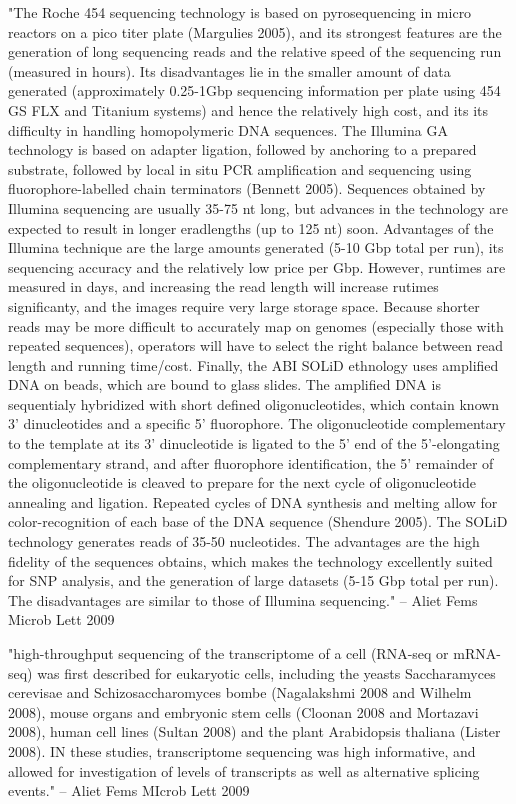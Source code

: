 \documentclass[10pt]{article}
\begin{document}
"The Roche 454 sequencing technology is based on pyrosequencing in micro reactors on a pico titer plate (Margulies 2005), and its strongest features are the generation of long sequencing reads and the relative speed of the sequencing run (measured in hours).  Its disadvantages lie in the smaller amount of data generated (approximately 0.25-1Gbp sequencing information per plate using 454 GS FLX and Titanium systems) and hence the relatively high cost, and its its difficulty in handling homopolymeric DNA sequences.  The Illumina GA technology is based on adapter ligation, followed by anchoring to a prepared substrate, followed by local in situ PCR amplification and sequencing using fluorophore-labelled chain terminators (Bennett 2005).  Sequences obtained by Illumina sequencing are usually 35-75 nt long, but advances in the technology are expected to result in longer eradlengths (up to 125 nt) soon.  Advantages of the Illumina technique are the large amounts generated (5-10 Gbp total per run), its sequencing accuracy and the relatively low price per Gbp.  However, runtimes are measured in days, and increasing the read length will increase rutimes significanty, and the images require very large storage space.  Because shorter reads may be more difficult to accurately map on genomes (especially those with repeated sequences), operators will have to select the right balance between read length and running time/cost.  Finally, the ABI SOLiD ethnology uses amplified DNA on beads, which are bound to glass slides.  The amplified DNA is sequentialy hybridized with short defined oligonucleotides, which contain known 3' dinucleotides and a specific 5' fluorophore.  The oligonucleotide complementary to the template at its 3' dinucleotide is ligated to the 5' end of the 5'-elongating complementary strand, and after fluorophore identification, the 5' remainder of the oligonucleotide is cleaved to prepare for the next cycle of oligonucleotide annealing and ligation.  Repeated cycles of DNA synthesis and melting allow for color-recognition of each base of the DNA sequence (Shendure 2005).  The SOLiD technology generates reads of 35-50 nucleotides.  The advantages are the high fidelity of the sequences obtains, which makes the technology excellently suited for SNP analysis, and the generation of large datasets (5-15 Gbp total per run).  The disadvantages are similar to those of Illumina sequencing." -- Aliet Fems Microb Lett 2009

"high-throughput sequencing of the transcriptome of a cell (RNA-seq or mRNA-seq) was first described for eukaryotic cells, including the yeasts Saccharamyces cerevisae and Schizosaccharomyces bombe (Nagalakshmi 2008 and Wilhelm 2008), mouse organs and embryonic stem cells (Cloonan 2008 and Mortazavi 2008), human cell lines (Sultan 2008) and the plant Arabidopsis thaliana (Lister 2008).  IN these studies, transcriptome sequencing was high informative, and allowed for investigation of levels of transcripts as well as alternative splicing events." -- Aliet Fems MIcrob Lett 2009
\end{document}
